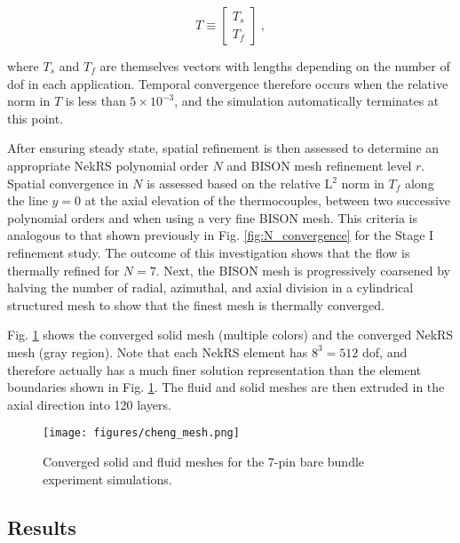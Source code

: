 \documentclass[3p,,preprint,11pt]{elsarticle}
\begin{document}
\begin{equation}
\label{eq:T}
T\equiv\begin{bmatrix}T_s \\ T_f\end{bmatrix}\ ,
\end{equation}

where $T_s$ and $T_f$ are themselves vectors with lengths depending on the number of \gls{dof} in each application. Temporal convergence therefore occurs when the relative norm in $T$ is less than $5\times10^{-3}$, and the simulation automatically terminates at this point. 

After ensuring steady state, spatial refinement is then assessed to determine an appropriate NekRS polynomial order $N$ and BISON mesh refinement level $r$. Spatial convergence in $N$ is assessed based on the relative L$^2$ norm in $T_f$ along the line $y=0$ at the axial elevation of the thermocouples, between two successive polynomial orders and when using a very fine BISON mesh. This criteria is analogous to that shown previously in Fig. \ref{fig:N_convergence} for the Stage I refinement study. The outcome of this investigation shows that the flow is thermally refined for $N=7$. Next, the BISON mesh is progressively coarsened by halving the number of radial, azimuthal, and axial division in a cylindrical structured mesh to show that the finest mesh is thermally converged.

Fig. \ref{fig:cheng_mesh} shows the converged solid mesh (multiple colors) and the converged NekRS mesh (gray region). Note that each NekRS element has $8^3=512$ \gls{dof}, and therefore actually has a much finer solution representation than the element boundaries shown in Fig. \ref{fig:cheng_mesh}. The fluid and solid meshes are then extruded in the axial direction into 120 layers.

\begin{figure}[!htb]                                                                                                  
\centering
\texttt{[image: figures/cheng\_mesh.png]}
\caption{Converged solid and fluid meshes for the 7-pin bare bundle experiment simulations.}
\label{fig:cheng_mesh}
\end{figure}

\subsection{Results}
\label{sec:cheng_results}
\end{document}
